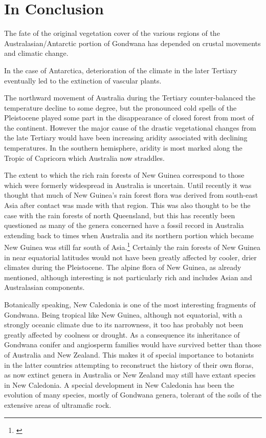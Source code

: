 \section{In Conclusion}

The fate of the original vegetation cover of the various regions of the Australasian/Antarctic portion of Gondwana has depended on crustal movements and climatic change.

In the case of Antarctica, deterioration of the climate in the later Tertiary eventually led to the extinction of vascular plants.

The northward movement of Australia during the Tertiary counter-balanced the temperature decline to some degree, but the pronounced cold spells of the Pleistocene played some part in the disappearance of closed forest from most of the continent.
However the major cause of the drastic vegetational changes from the late Tertiary would have been increasing aridity associated with declining temperatures.
In the southern hemisphere, aridity is most marked along the Tropic of Capricorn which Australia now straddles.

The extent to which the rich rain forests of New Guinea correspond to those which were formerly widespread in Australia is uncertain.
Until recently it was thought that much of New Guinea's rain forest flora was derived from south-east Asia after contact was made with that region.
This was also thought to be the case with the rain forests of north Queensland, but this has recently been questioned as many of the genera concerned have a fossil record in Australia extending back to times when Australia and its northern portion which became New Guinea was still far south of Asia.\footnote{\cite{webb1986recent}}
Certainly the rain forests of New Guinea in near equatorial latitudes would not have been greatly affected by cooler, drier climates during the Pleistocene.
The alpine flora of New Guinea, as already mentioned, although interesting is not particularly rich and includes Asian and Australasian components.

Botanically speaking, New Caledonia is one of the most interesting fragments of Gondwana.
Being tropical like New Guinea, although not equatorial, with a strongly oceanic climate due to its narrowness, it too has probably not been greatly affected by coolness or drought.
As a consequence its inheritance of Gondwana conifer and angiosperm families would have survived better than those of Australia and New Zealand.
This makes it of special importance to botanists in the latter countries attempting to reconstruct the history of their own floras, as now extinct genera in Australia or New Zealand may still have extant species in New Caledonia.
A special development in New Caledonia has been the evolution of many species, mostly of Gondwana genera, tolerant of the soils of the extensive areas of ultramafic rock.

